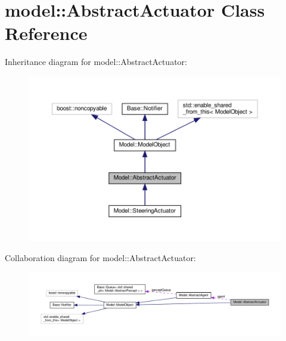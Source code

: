 \hypertarget{class_model_1_1_abstract_actuator}{}\section{model\+:\+:Abstract\+Actuator Class Reference}
\label{class_model_1_1_abstract_actuator}


Inheritance diagram for model\+:\+:Abstract\+Actuator\+:
\nopagebreak
\begin{figure}[H]
\begin{center}
\leavevmode
\includegraphics[width=350pt]{class_model_1_1_abstract_actuator__inherit__graph}
\end{center}
\end{figure}


Collaboration diagram for model\+:\+:Abstract\+Actuator\+:
\nopagebreak
\begin{figure}[H]
\begin{center}
\leavevmode
\includegraphics[width=350pt]{class_model_1_1_abstract_actuator__coll__graph}
\end{center}
\end{figure}
